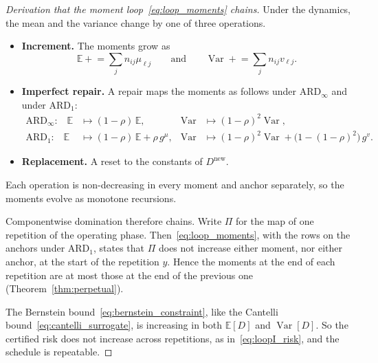 \documentclass[11pt,a4paper]{article}
\theoremstyle{plain}
\theoremstyle{definition}
\theoremstyle{remark}
\begin{document}
\label{drv:loopI_moments}
\begin{proof}[Derivation that the moment loop~\eqref{eq:loop_moments} chains]
Under the dynamics, the mean and the variance change by one of three operations.
\begin{itemize}
  \item \textbf{Increment.} The moments grow as
    \begin{equation}
      \mathbb{E} \mathrel{+}= \sum_j n_{ij}\mu_{\ell j}
      \qquad\text{and}\qquad
      \operatorname{Var} \mathrel{+}= \sum_j n_{ij} v_{\ell j}.
    \end{equation}
  \item \textbf{Imperfect repair.} A repair maps the moments as follows under $\text{ARD}_\infty$ and under $\text{ARD}_1$:
    \begin{align}
      \text{$\text{ARD}_\infty$:}\quad \mathbb{E} &\mapsto (1-\rho)\,\mathbb{E}, &
      \operatorname{Var} &\mapsto (1-\rho)^2\operatorname{Var},\\
      \text{$\text{ARD}_1$:}\quad \mathbb{E} &\mapsto (1-\rho)\,\mathbb{E} + \rho\, g^{\mu}, &
      \operatorname{Var} &\mapsto (1-\rho)^2\operatorname{Var} + \bigl(1-(1-\rho)^2\bigr)\, g^{v}.
    \end{align}
  \item \textbf{Replacement.} A reset to the constants of $D^{\mathrm{new}}$.
\end{itemize}
Each operation is non-decreasing in every moment and anchor separately, so the moments evolve as monotone recursions.

Componentwise domination therefore chains.
Write $\Pi$ for the map of one repetition of the operating phase.
Then~\eqref{eq:loop_moments}, with the rows on the anchors under $\text{ARD}_1$, states that $\Pi$ does not increase either moment, nor either anchor, at the start of the repetition $y$.
Hence the moments at the end of each repetition are at most those at the end of the previous one (Theorem~\ref{thm:perpetual}).

The Bernstein bound~\eqref{eq:bernstein_constraint}, like the Cantelli bound~\eqref{eq:cantelli_surrogate}, is increasing in both $\mathbb{E}[D]$ and $\operatorname{Var}[D]$.
So the certified risk does not increase across repetitions, as in~\eqref{eq:loopI_risk}, and the schedule is repeatable.
\end{proof}
\end{document}
